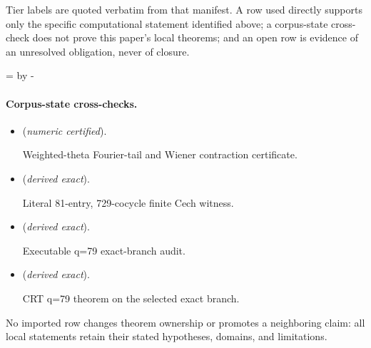 \documentclass[11pt]{article}
\theoremstyle{definition}
\theoremstyle{remark}
\begin{document}
Tier labels are quoted verbatim from that manifest. A row used directly supports only the specific computational statement identified above; a corpus-state cross-check does not prove this paper's local theorems; and an open row is evidence of an unresolved obligation, never of closure.

\par\begingroup{}=\pagegoal\advance{} by -\pagetotal\ifdim\dimen0<7\baselineskip\newpage\fi\endgroup
\paragraph{Corpus-state cross-checks.}
\begin{itemize}
\setlength{\itemsep}{0.25em}
\item {} (\emph{numeric certified}).\par Weighted-theta Fourier-tail and Wiener contraction certificate.
\item {} (\emph{derived exact}).\par Literal 81-entry, 729-cocycle finite Cech witness.
\item {} (\emph{derived exact}).\par Executable q=79 exact-branch audit.
\item {} (\emph{derived exact}).\par CRT q=79 theorem on the selected exact branch.
\end{itemize}

No imported row changes theorem ownership or promotes a neighboring claim: all local statements retain their stated hypotheses, domains, and limitations.


\end{document}
